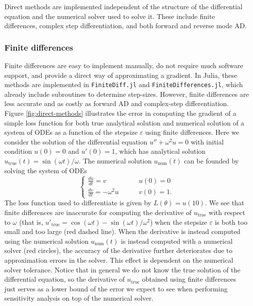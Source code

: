 Direct methods are implemented independent of the structure of the differential equation and the numerical solver used to solve it. 
These include finite differences, complex step differentiation, and both forward and reverse mode AD. 

\subsubsection{Finite differences}
\label{section:software-finite-differences}

Finite differences are easy to implement manually, do not require much software support, and provide a direct way of approximating a gradient. 
In Julia, these methods are implemented in \texttt{FiniteDiff.jl} and \texttt{FiniteDifferences.jl}, which already include subroutines to determine step-sizes.
However, finite differences are less accurate and as costly as forward AD \cite{Griewank_1989} and complex-step differentiation. 
Figure \ref{fig:direct-methods} illustrates the error in computing the gradient of a simple loss function for both true analytical solution and numerical solution of a system of ODEs as a function of the stepsize $\varepsilon$ using finite differences.
Here we consider the solution of the differential equation $u'' + \omega^2 u = 0$ with initial condition $u(0)=0$ and $u'(0)=1$, which has analytical solution $u_\text{true}(t) = \sin(\omega t) / \omega$.
The numerical solution $u_\text{num}(t)$ can be founded by solving the system of ODEs
\begin{equation}
\begin{cases}
    \frac{du}{dt} = v \,   & \qquad u(0) = 0 \\
    \frac{dv}{dt} = - \omega^2 u \,   & \qquad v(0) = 1.
    \label{eq:example-ode-direct-methods}
\end{cases}
\end{equation}
The loss function used to differentiate is given by $L(\theta) = u(10)$.
We see that finite differences are inaccurate for computing the derivative of $u_\text{true}$ with respect to $\omega$ (that is, $u'_\text{true} = \cos(\omega t) - \sin (\omega t) / \omega^2$) when the stepsize $\varepsilon$ is both too small and too large (red dashed line).
When the derivative is instead computed using the numerical solution $u_\text{num}(t)$ is instead computed with a numerical solver (red circles), the accuracy of the derivative further deteriorates due to approximation errors in the solver. 
This effect is dependent on the numerical solver tolerance.
Notice that in general we do not know the true solution of the differential equation, so the derivative of $u_\text{true}$ obtained using finite differences just serves as a lower bound of the error we expect to see when performing sensitivity analysis on top of the numerical solver. 

